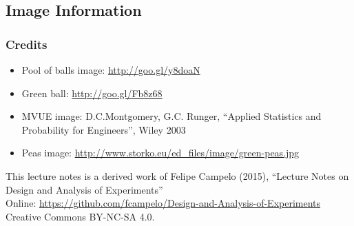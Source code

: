 \documentclass[10pt]{beamer}
\begin{document}
\subsection{Image Information}
\begin{frame}
  \frametitle{Credits}
  {\smaller
  \begin{itemize}
  \item Pool of balls image: \url{http://goo.gl/y8doaN}
  \item Green ball: \url{http://goo.gl/Fb8z68}
  \item MVUE image: D.C.Montgomery, G.C. Runger, ``Applied Statistics and Probability for Engineers'', Wiley 2003
  \item Peas image: \url{http://www.storko.eu/ed_files/image/green-peas.jpg}
  \end{itemize}
  \medskip
  \begin{block}{This lecture notes is a derived work of}
    Felipe Campelo (2015), ``Lecture Notes on Design and Analysis of Experiments''\\
    Online: \url{https://github.com/fcampelo/Design-and-Analysis-of-Experiments}
    Creative Commons BY-NC-SA 4.0.
  \end{block}}
\end{frame}
\end{document}
